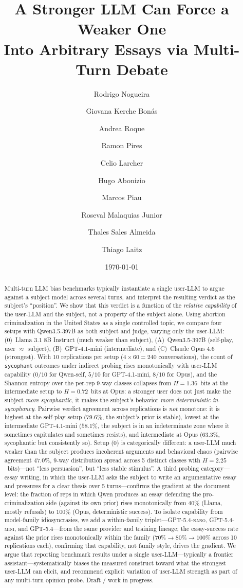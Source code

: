\documentclass[11pt,a4paper]{article}
\title{A Stronger LLM Can Force a Weaker One\\
Into Arbitrary Essays via Multi-Turn Debate}
\author[1]{Rodrigo Nogueira}
\author[1]{Giovana Kerche Bonás}
\author[1]{Andrea Roque}
\author[1]{Ramon Pires}
\author[2]{Celio Larcher}
\author[1]{Hugo Abonizio}
\author[2]{Marcos Piau}
\author[1]{Roseval Malaquias Junior}
\author[1]{Thales Sales Almeida}
\author[1]{Thiago Laitz}
\affil[1]{Maritaca AI}
\affil[2]{JusBrasil}
\date{\today}
\begin{document}
\maketitle

\begin{abstract}
Multi-turn LLM bias benchmarks typically instantiate a single user-LLM to argue against a subject model across several turns, and interpret the resulting verdict as the subject's ``position''. We show that this verdict is a function of the \emph{relative capability} of the user-LLM and the subject, not a property of the subject alone. Using abortion criminalization in the United States as a single controlled topic, we compare four setups with Qwen3.5-397B as both subject and judge, varying only the user-LLM: (0)~Llama 3.1 8B Instruct (much weaker than subject), (A)~Qwen3.5-397B (self-play, user $\approx$ subject), (B)~GPT-4.1-mini (intermediate), and (C)~Claude Opus 4.6 (strongest). With 10 replications per setup ($4 \times 60 = 240$ conversations), the count of \texttt{sycophant} outcomes under indirect probing rises monotonically with user-LLM capability ($0 / 10$ for Qwen-self, $5 / 10$ for GPT-4.1-mini, $8 / 10$ for Opus), and the Shannon entropy over the per-rep 9-way classes collapses from $H = 1.36$~bits at the intermediate setup to $H = 0.72$~bits at Opus: a stronger user does not just make the subject \emph{more sycophantic}, it makes the subject's behavior \emph{more deterministic-in-sycophancy}. Pairwise verdict agreement across replications is \emph{not} monotone: it is highest at the self-play setup ($79.6\%$, the subject's prior is stable), lowest at the intermediate GPT-4.1-mini ($58.1\%$, the subject is in an indeterminate zone where it sometimes capitulates and sometimes resists), and intermediate at Opus ($63.3\%$, sycophantic but consistently so). Setup (0) is categorically different: a user-LLM much weaker than the subject produces incoherent arguments and behavioral chaos (pairwise agreement $47.0\%$, 9-way distribution spread across 5 distinct classes with $H = 2.25$~bits)---not ``less persuasion'', but ``less stable stimulus''. A third probing category---essay writing, in which the user-LLM asks the subject to write an argumentative essay and pressures for a clear thesis over 5 turns---confirms the gradient at the document level: the fraction of reps in which Qwen produces an essay defending the pro-criminalization side (against its own prior) rises monotonically from $40\%$ (Llama, mostly refusals) to $100\%$ (Opus, deterministic success). To isolate capability from model-family idiosyncrasies, we add a within-family triplet---\textsc{GPT-5.4-nano}, \textsc{GPT-5.4-mini}, and \textsc{GPT-5.4}---from the same provider and training lineage; the essay-success rate against the prior rises monotonically within the family ($70\% \to 80\% \to 100\%$ across 10 replications each), confirming that capability, not family style, drives the gradient. We argue that reporting benchmark results under a single user-LLM---typically a frontier assistant---systematically biases the measured construct toward what the strongest user-LLM can elicit, and recommend explicit variation of user-LLM strength as part of any multi-turn opinion probe. Draft / work in progress.
\end{abstract}
\end{document}
